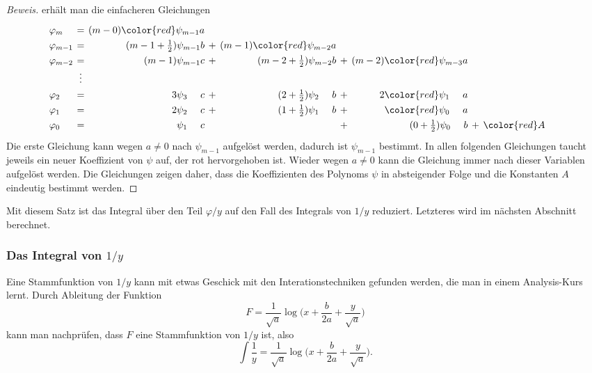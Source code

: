 \begin{proof}[Beweis]
erhält man die einfacheren Gleichungen
\begin{equation}
\renewcommand{\arraycolsep}{2pt}
\renewcommand{\arraystretch}{1.3}
\begin{array}{lcrcrcrcrcrcrcr}
\varphi_m
&=&
(m-0){\color{red}\psi_{m-1}}a & &     & & 
& &
\\
\varphi_{m-1}
&=&
(m-1+\frac12)\psi_{m-1}b
&+&
(m-1){\color{red}\psi_{m-2}}a
& &
& &
\\
\varphi_{m-2}
&=&
(m-1)\psi_{m-1}c
&+&
(m-2+\frac12)\psi_{m-2}b
&+&
(m-2){\color{red}\psi_{m-3}}a
& &
\\
&\vdots&&&&&&&&&&&
\\
\varphi_2
&=&
3\psi_{3\phantom{-m}}c
&+&
(2+\frac12)\psi_{2\phantom{-m}}b
&+&
2{\color{red}\psi_{1\phantom{-m}}}a
& &
\\
\varphi_1
&=&
2\psi_{2\phantom{-m}}c
&+&
(1+\frac12)\psi_{1\phantom{-m}}b
&+&
{\color{red}\psi_{0\phantom{-m}}}a
& &
\\
\varphi_0
&=&
\psi_{1\phantom{-m}}c
& &
&+&
(0+\frac12) \psi_{0\phantom{-m}}b
&+&{\color{red}A}
\end{array}
\end{equation}
Die erste Gleichung kann wegen $a\ne 0$ nach $\psi_{m-1}$ aufgelöst werden,
dadurch ist $\psi_{m-1}$ bestimmt.
In allen folgenden Gleichungen taucht jeweils ein neuer Koeffizient
von $\psi$ auf, der rot hervorgehoben ist.
Wieder wegen $a\ne 0$ kann die Gleichung immer nach dieser Variablen
aufgelöst werden.
Die Gleichungen zeigen daher, dass die Koeffizienten des Polynoms $\psi$
in absteigender Folge und die Konstanten $A$ eindeutig bestimmt werden.
\end{proof}

Mit diesem Satz ist das Integral über den Teil $\varphi/y$ auf den
Fall des Integrals von $1/y$ reduziert.
Letzteres wird im nächsten Abschnitt berechnet.

%
%
\subsubsection{Das Integral von $1/y$}
Eine Stammfunktion von $1/y$ kann mit etwas Geschick mit den 
Interationstechniken gefunden werden, die man in einem Analysis-Kurs
lernt.
Durch Ableitung der Funktion
\[
F
=
\frac{1}{\sqrt{a}}\log\biggl(x+\frac{b}{2a}+\frac{y}{\sqrt{a}}\biggr)
\]
kann man nachprüfen, dass $F$ eine Stammfunktion von $1/y$ ist,
also
\begin{equation}
\int
\frac{1}{y}
=
\frac{1}{\sqrt{a}}\log\biggl(x+\frac{b}{2a}+\frac{y}{\sqrt{a}}\biggr).
\end{equation}

